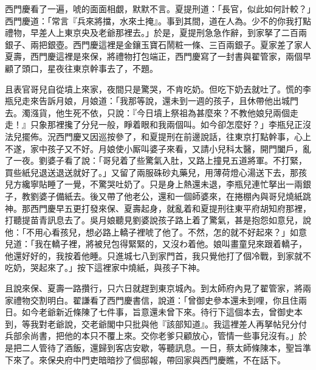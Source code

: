 西門慶看了一遍，唬的面面相覷，默默不言。夏提刑道：「長官，似此如何計較？」西門慶道：「常言『兵來將擋，水來土掩』。事到其間，道在人為。少不的你我打點禮物，早差人上東京央及老爺那裡去。」於是，夏提刑急急作辭，到家拏了二百兩銀子、兩把銀壺。西門慶這裡是金鑲玉寶石鬧粧一條、三百兩銀子。夏家差了家人夏壽，西門慶這裡是來保，將禮物打包端正，西門慶寫了一封書與翟管家，兩個早顧了頭口，星夜往東京幹事去了，不題。

且表官哥兒自從墳上來家，夜間只是驚哭，不肯吃奶。但吃下奶去就吐了。慌的李瓶兒走來告訴月娘，月娘道：「我那等說，還未到一週的孩子，且休帶他出城門去。濁漒貨，他生死不依，只說：『今日墳上祭祖為甚麼來？不教他娘兒兩個走走！』只象那裡攙了分兒一般，睜着眼和我兩個叫。如今卻怎麼好？」{}李瓶兒正沒法兒擺佈。況西門慶又因巡按參了，和夏提刑在前邊說話，往東京打點幹事，心上不遂，家中孩子又不好。月娘使小厮叫婆子來看，又請小兒科太醫，開門闔戶，亂了一夜。劉婆子看了說：「哥兒着了些驚氣入肚，又路上撞見五道將軍。不打緊，買些紙兒退送退送就好了。」又留了兩服硃砂丸藥兒，用薄荷燈心湯送下去，那孩兒方纔寧貼睡了一覺，不驚哭吐奶了。只是身上熱還未退，李瓶兒連忙拏出一兩銀子，教劉婆子備紙去。後又帶了他老公，還和一個師婆來，在捲棚內與哥兒燒紙跳神。那西門慶早五更打發來保、夏壽起身，就亂着和夏提刑往東平府胡知府那裡，打聽提苗青訊息去了。吳月娘聽見劉婆說孩子路上着了驚氣，甚是抱怨如意兒，{}說他：「不用心看孩兒，想必路上轎子裡唬了他了。不然，怎的就不好起來？」如意兒道：「我在轎子裡，將被兒包得緊緊的，又沒わ着他。娘叫畫童兒來跟着轎子，他還好好的，我按着他睡。只進城七八到家門首，我只覺他打了個冷戰，到家就不吃奶，哭起來了。」{}按下這裡家中燒紙，與孩子下神。

且說來保、夏壽一路攢行，只六日就趕到東京城內。到太師府內見了翟管家，將兩家禮物交割明白。翟謙看了西門慶書信，說道：「曾御史參本還未到哩，{}你且住兩日。如今老爺新近條陳了七件事，旨意還未曾下來。待行下這個本去，曾御史本到，等我對老爺說，交老爺閣中只批與他『該部知道』。我這裡差人再拏帖兒分付兵部余尚書，把他的本只不覆上來。交你老爹只顧放心，管情一些事兒沒有。」於是把二人管待了酒飯，還歸到客店安歇，等聽訊息。一日，蔡太師條陳本，聖旨準下來了。來保央府中門吏暗暗抄了個邸報，帶回家與西門慶瞧，不在話下。

